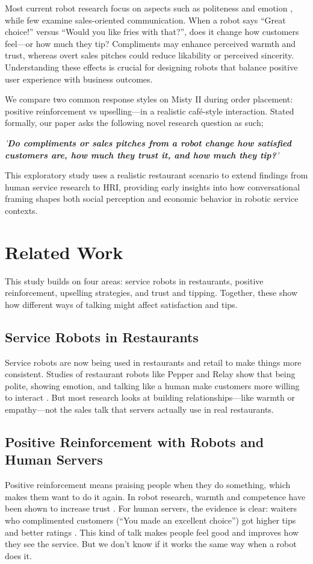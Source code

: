 \documentclass[conference]{IEEEtran}
\begin{document}
Most current robot research focus on aspects such as politeness and emotion \cite{b5}, while few examine sales-oriented communication. When a robot says ``Great choice!'' versus ``Would you like fries with that?'', does it change how customers feel—or how much they tip? Compliments may enhance perceived warmth and trust, whereas overt sales pitches could reduce likability or perceived sincerity. Understanding these effects is crucial for designing robots that balance positive user experience with business outcomes.

We compare two common response styles on Misty II during order placement: positive reinforcement vs upselling—in a realistic café-style interaction. Stated formally, our paper asks the following novel research question as such;

\textit{'\textbf{Do compliments or sales pitches from a robot change how satisfied customers are, how much they trust it, and how much they tip?}'}

This exploratory study uses a realistic restaurant scenario to extend findings from human service research to HRI, providing early insights into how conversational framing shapes both social perception and economic behavior in robotic service contexts.
\section{Related Work}
\label{sec:related_work}
This study builds on four areas: service robots in restaurants, positive reinforcement, upselling strategies, and trust and tipping. Together, these show how different ways of talking might affect satisfaction and tips.

\subsection{Service Robots in Restaurants}
Service robots are now being used in restaurants and retail to make things more consistent. Studies of restaurant robots like Pepper and Relay show that being polite, showing emotion, and talking like a human make customers more willing to interact \cite{b5}. But most research looks at building relationships—like warmth or empathy—not the sales talk that servers actually use in real restaurants.

\subsection{Positive Reinforcement with Robots and Human Servers}
Positive reinforcement means praising people when they do something, which makes them want to do it again. In robot research, warmth and competence have been shown to increase trust \cite{b6}. For human servers, the evidence is clear: waiters who complimented customers (``You made an excellent choice'') got higher tips and better ratings \cite{b3, b7}. This kind of talk makes people feel good and improves how they see the service. But we don't know if it works the same way when a robot does it.
\end{document}

